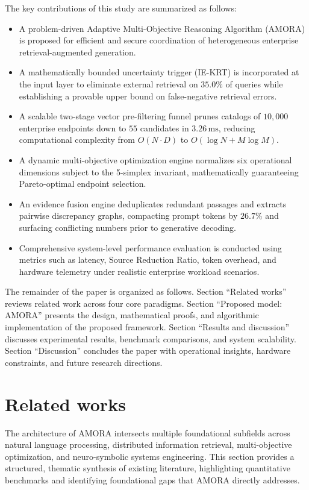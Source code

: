\documentclass[fleqn,10pt]{article}
\begin{document}
The key contributions of this study are summarized as follows:
\begin{itemize}[leftmargin=1.5em]
    \item A problem-driven Adaptive Multi-Objective Reasoning Algorithm (AMORA) is proposed for efficient and secure coordination of heterogeneous enterprise retrieval-augmented generation.
    \item A mathematically bounded uncertainty trigger (IE-KRT) is incorporated at the input layer to eliminate external retrieval on $35.0\%$ of queries while establishing a provable upper bound on false-negative retrieval errors.
    \item A scalable two-stage vector pre-filtering funnel prunes catalogs of $10{,}000$ enterprise endpoints down to $55$ candidates in $3.26\,\text{ms}$, reducing computational complexity from $O(N \cdot D)$ to $O(\log N + M \log M)$.
    \item A dynamic multi-objective optimization engine normalizes six operational dimensions subject to the 5-simplex invariant, mathematically guaranteeing Pareto-optimal endpoint selection.
    \item An evidence fusion engine deduplicates redundant passages and extracts pairwise discrepancy graphs, compacting prompt tokens by $26.7\%$ and surfacing conflicting numbers prior to generative decoding.
    \item Comprehensive system-level performance evaluation is conducted using metrics such as latency, Source Reduction Ratio, token overhead, and hardware telemetry under realistic enterprise workload scenarios.
\end{itemize}

The remainder of the paper is organized as follows. Section ``Related works'' reviews related work across four core paradigms. Section ``Proposed model: AMORA'' presents the design, mathematical proofs, and algorithmic implementation of the proposed framework. Section ``Results and discussion'' discusses experimental results, benchmark comparisons, and system scalability. Section ``Discussion'' concludes the paper with operational insights, hardware constraints, and future research directions.

\section{Related works}
The architecture of AMORA intersects multiple foundational subfields across natural language processing, distributed information retrieval, multi-objective optimization, and neuro-symbolic systems engineering. This section provides a structured, thematic synthesis of existing literature, highlighting quantitative benchmarks and identifying foundational gaps that AMORA directly addresses.
\end{document}
